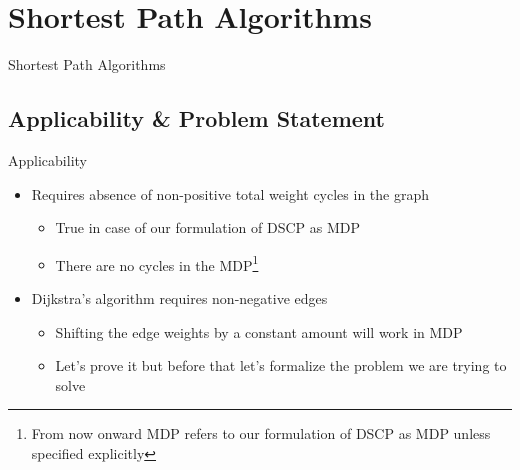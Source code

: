 \documentclass{beamer}
\begin{document}
\section{Shortest Path Algorithms}
\begin{frame}{Shortest Path Algorithms}
\addtocounter{framenumber}{-1}
\tableofcontents[currentsection]
\end{frame}

\subsection{Applicability \& Problem Statement}
\begin{frame}{Applicability}
\begin{itemize}
\item Requires absence of non-positive total weight cycles in the graph
\begin{itemize}
\item True in case of our formulation of DSCP as MDP
\item There are no cycles in the MDP\footnote{From now onward MDP refers to our formulation of DSCP as MDP unless specified explicitly}
\end{itemize}
\item Dijkstra's algorithm requires non-negative edges
\begin{itemize}
\item Shifting the edge weights by a constant amount will work in MDP
\item Let's prove it but before that let's formalize the problem we are trying to solve
\end{itemize}
\end{itemize}
\end{frame}
\end{document}

